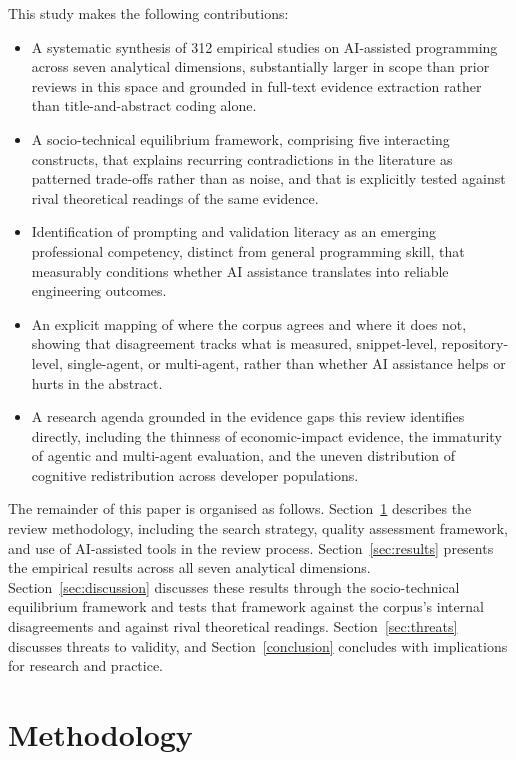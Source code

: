 This study makes the following contributions:

\begin{itemize}
    \item A systematic synthesis of 312 empirical studies on AI-assisted programming across seven analytical dimensions, substantially larger in scope than prior reviews in this space and grounded in full-text evidence extraction rather than title-and-abstract coding alone.
    \item A socio-technical equilibrium framework, comprising five interacting constructs, that explains recurring contradictions in the literature as patterned trade-offs rather than as noise, and that is explicitly tested against rival theoretical readings of the same evidence.
    \item Identification of prompting and validation literacy as an emerging professional competency, distinct from general programming skill, that measurably conditions whether AI assistance translates into reliable engineering outcomes.
    \item An explicit mapping of where the corpus agrees and where it does not, showing that disagreement tracks what is measured, snippet-level, repository-level, single-agent, or multi-agent, rather than whether AI assistance helps or hurts in the abstract.
    \item A research agenda grounded in the evidence gaps this review identifies directly, including the thinness of economic-impact evidence, the immaturity of agentic and multi-agent evaluation, and the uneven distribution of cognitive redistribution across developer populations.
\end{itemize}

The remainder of this paper is organised as follows. Section~\ref{sec:methodology} describes the review methodology, including the search strategy, quality assessment framework, and use of AI-assisted tools in the review process. Section~\ref{sec:results} presents the empirical results across all seven analytical dimensions. Section~\ref{sec:discussion} discusses these results through the socio-technical equilibrium framework and tests that framework against the corpus's internal disagreements and against rival theoretical readings. Section~\ref{sec:threats} discusses threats to validity, and Section~\ref{conclusion} concludes with implications for research and practice.

\section{Methodology}
\label{sec:methodology}

